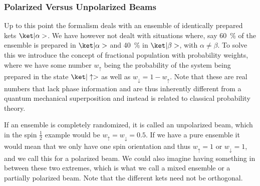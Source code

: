 \subsubsection{Polarized Versus Unpolarized Beams}
Up to this point the formalism deals with an ensemble of identically prepared kets $\k{\alpha}$. We have however not dealt with situations where, say \qty{60}{\percent} of the ensemble is prepared in $\k{\alpha}$ and \qty{40}{\percent} in $\k{\beta}$, with $\alpha\neq\beta$. To solve this we introduce the concept of fractional population with probability weights, where we have some number $w_\uparrow$ being the probability of the system being prepared in the state $\k{\uparrow}$ as well as $w_\downarrow = 1 -w_\uparrow$. Note that these are real numbers that lack phase information and are thus inherently different from a quantum mechanical superposition and instead is related to classical probability theory.

If an ensemble is completely randomized, it is called an unpolarized beam, which in the spin $\frac{1}{2}$ example would be $w_\uparrow = w_\downarrow = 0.5$. If we have a pure ensemble it would mean that we only have one spin orientation and thus $w_\uparrow = 1$ or $w_\downarrow=1$, and we call this for a polarized beam. We could also imagine having something in between these two extremes, which is what we call a mixed ensemble or a partially polarized beam. Note that the different kets need not be orthogonal.

